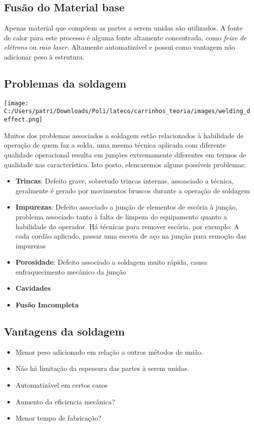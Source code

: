 \subsection{Fusão do Material base}
	Apenas material que compõem as partes a serem unidas são utilizados. A fonte de calor para este processo é alguma fonte altamente concentrada, como \textit{feixe de elétrons} ou \textit{raio laser}. Altamente automatizável e possui como vantagem não adicionar peso à estrutura.
	
\subsection{Problemas da soldagem}

\begin{center}
\texttt{[image: C:/Users/patri/Downloads/Poli/lateco/carrinhos\_teoria/images/welding\_deffect.png]}  
\end{center}

Muitos dos problemas associados a soldagem estão relacionados à habilidade de operação de quem faz a solda, uma mesma técnica aplicada com diferente qualidade operacional resulta em junções extremamente diferentes em termos de qualidade nas característica. Isto posto, elencaremos alguns possíveis problemas:

\begin{itemize}
	\item \textbf{Trincas}: Defeito grave, sobretudo trincas internas, assoaciado a técnica, geralmente é gerado por movimentos bruscos durante a operação de soldagem
	\item \textbf{Impurezas}: Defeito associado a junção de elementos de escória à junção, problema associado tanto à falta de limpeza do equipamento quanto a habilidade do operador. Há técnicas para remover escória, por exemplo: A cada cordão aplicado, passar uma escova de aço na junção para remoção das impurezas
	\item \textbf{Porosidade}: Defeito associado a soldagem muito rápida, causa enfraquecimento mecânico da junção
	\item \textbf{Cavidades}
	\item \textbf{Fusão Imcompleta}
\end{itemize}

\subsection{Vantagens da soldagem}
\begin{itemize}
	\item Menor peso adicionado em relação a outros métodos de união.
	\item Não há limitação da espessura das partes à serem unidas.
	\item Automatizável em certos casos
	\item Aumento da eficiencia mecânica?
	\item Menor tempo de fabricação?
\end{itemize}

